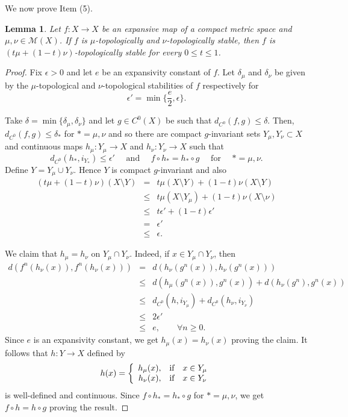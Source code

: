 \documentclass[11pt,letterpaper]{amsart}
\theoremstyle{plain}
\newtheorem{lemma}{Lemma}
\begin{document}
We now prove Item (5).

\begin{lemma}
\label{mama}
Let $f:X\to X$ be an expansive map of a compact metric space
and $\mu,\nu\in\mathcal{M}(X)$.
If $f$ is $\mu$-topologically and $\nu$-topologically stable, then $f$ is $(t\mu+(1-t)\nu)$-topologically stable for every $0\leq t\leq 1$.
\end{lemma}

\begin{proof}
Fix $\epsilon>0$ and let $e$ be an expansivity constant of $f$.
Let $\delta_\mu$ and $\delta_\nu$ be given by the $\mu$-topological and $\nu$-topological stabilities of $f$ respectively
for
$$
\epsilon'=\min\{\frac{e}2,\epsilon\}.
$$

Take $\delta=\min\{\delta_\mu,\delta_\nu\}$ and let $g\in C^0(X)$ be such that
$d_{C^0}(f,g)\leq\delta$.
Then, $d_{C^0}(f,g)\leq\delta_*$ for $*=\mu,\nu$ and so
there are compact $g$-invariant sets $Y_\mu,Y_\nu\subset X$ and continuous maps $h_\mu:Y_\mu\to X$ and $h_\nu:Y_\nu\to X$ such that
$$
d_{C^0}(h_*,i_{Y_*})\leq\epsilon'\quad\mbox{ and }\quad
f\circ h_*=h_*\circ g\quad\mbox{ for }\quad *=\mu,\nu.
$$
Define $Y=Y_\mu\cup Y_\nu$. Hence $Y$ is compact $g$-invariant and also
\begin{eqnarray*}
(t\mu+(1-t)\nu)(X\setminus Y) & = & t\mu(X\setminus Y)+(1-t)\nu(X\setminus Y)\\
& \leq & t\mu(X\setminus Y_\mu)+(1-t)\nu(X\setminus \nu)\\
& \leq & t\epsilon'+(1-t)\epsilon'\\
& = & \epsilon'\\
& \leq & \epsilon.
\end{eqnarray*}

We claim that $h_\mu=h_\nu$ on $Y_\mu\cap Y_\nu$.
Indeed, if $x\in Y_\mu\cap Y_\nu$,
then
\begin{eqnarray*}
d(f^n(h_\nu(x)),f^n(h_\nu(x))) & = & d(h_\nu(g^n(x)),h_\nu(g^n(x)))\\
& \leq & d(h_\mu(g^n(x)),g^n(x))+d(h_\nu(g^n),g^n(x))\\
& \leq & d_{C^0}(h,i_{Y_\mu})+d_{C^0}(h_\nu,i_{Y_\nu})\\
& \leq & 2\epsilon'\\
& \leq & e,\quad\quad\forall n\geq0.
\end{eqnarray*}
Since $e$ is an expansivity constant, we get $h_\mu(x)=h_\nu(x)$ proving the claim.
It follows that $h:Y\to X$ defined by
$$
h(x) = \left\{
\begin{array}{rll}
h_\mu(x),   & \hbox{if} & x \in Y_\mu \\
h_\nu(x),  & \hbox{if} & x \in Y_\nu
\end{array}
\right.
$$
is well-defined and continuous.
Since
$f\circ h_*=h_*\circ g$ for $*=\mu,\nu$,
we get $f\circ h=h\circ g$ proving the result.
\end{proof}
\end{document}
